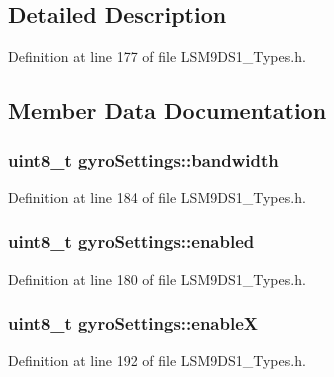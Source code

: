 \subsection{Detailed Description}


Definition at line 177 of file L\+S\+M9\+D\+S1\+\_\+\+Types.\+h.



\subsection{Member Data Documentation}
\subsubsection[{\texorpdfstring{bandwidth}{bandwidth}}]{\setlength{\rightskip}{0pt plus 5cm}uint8\+\_\+t gyro\+Settings\+::bandwidth}\hypertarget{structgyro_settings_ac3f0782333ec55165c1f589d445ba374}{}\label{structgyro_settings_ac3f0782333ec55165c1f589d445ba374}


Definition at line 184 of file L\+S\+M9\+D\+S1\+\_\+\+Types.\+h.

\subsubsection[{\texorpdfstring{enabled}{enabled}}]{\setlength{\rightskip}{0pt plus 5cm}uint8\+\_\+t gyro\+Settings\+::enabled}\hypertarget{structgyro_settings_ac9c769eeefed971baac74a7b81b25e7b}{}\label{structgyro_settings_ac9c769eeefed971baac74a7b81b25e7b}


Definition at line 180 of file L\+S\+M9\+D\+S1\+\_\+\+Types.\+h.

\subsubsection[{\texorpdfstring{enableX}{enableX}}]{\setlength{\rightskip}{0pt plus 5cm}uint8\+\_\+t gyro\+Settings\+::enableX}\hypertarget{structgyro_settings_a7c1000d1151579743faa376d49751f1d}{}\label{structgyro_settings_a7c1000d1151579743faa376d49751f1d}


Definition at line 192 of file L\+S\+M9\+D\+S1\+\_\+\+Types.\+h.


